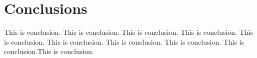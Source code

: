 \section{Conclusions}
This is conclusion. This is conclusion. This is conclusion. This is conclusion. This is conclusion. This is conclusion. This is conclusion. This is conclusion. This is conclusion.This is conclusion.